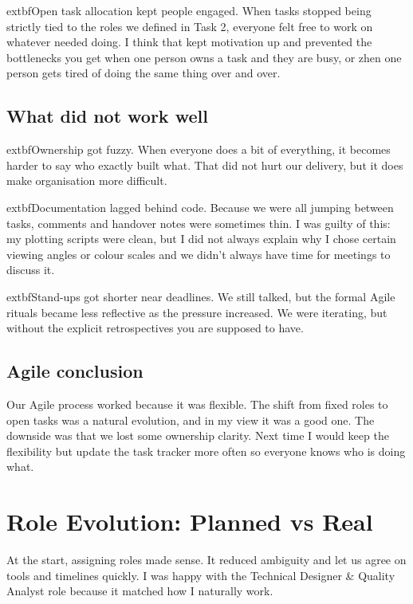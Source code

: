 \noindent 	extbf{Open task allocation kept people engaged.} When tasks stopped being strictly tied to the roles we defined in Task 2, everyone felt free to work on whatever needed doing. I think that kept motivation up and prevented the bottlenecks you get when one person owns a task and they are busy, or zhen one person gets tired of doing the same thing over and over.


\section{What did not work well}


\noindent 	extbf{Ownership got fuzzy.} When everyone does a bit of everything, it becomes harder to say who exactly built what. That did not hurt our delivery, but it does make organisation more difficult.


\noindent 	extbf{Documentation lagged behind code.} Because we were all jumping between tasks, comments and handover notes were sometimes thin. I was guilty of this: my plotting scripts were clean, but I did not always explain why I chose certain viewing angles or colour scales and we didn't always have time for meetings to discuss it.


\noindent 	extbf{Stand-ups got shorter near deadlines.} We still talked, but the formal Agile rituals became less reflective as the pressure increased. We were iterating, but without the explicit retrospectives you are supposed to have.


\section{Agile conclusion}


\noindent Our Agile process worked because it was flexible. The shift from fixed roles to open tasks was a natural evolution, and in my view it was a good one. The downside was that we lost some ownership clarity. Next time I would keep the flexibility but update the task tracker more often so everyone knows who is doing what.


\chapter{Role Evolution: Planned vs Real}


\noindent At the start, assigning roles made sense. It reduced ambiguity and let us agree on tools and timelines quickly. I was happy with the Technical Designer \& Quality Analyst role because it matched how I naturally work.


